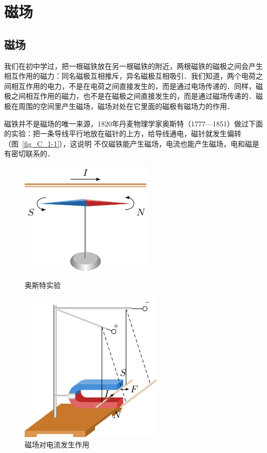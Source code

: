 \chapter{磁场}\label{chapter-magnetic-field}

\section{磁场}
我们在初中学过，把一根磁铁放在另一根磁铁的附近，两根磁铁的磁极之间会产生相互作用的磁力：同名磁极互相推斥，异名磁极互相吸引．我们知道，两个电荷之间相互作用的电力，不是在电荷之间直接发生的，而是通过电场传递的．同样，磁极之间相互作用的磁力，也不是在磁极之间直接发生的，而是通过磁场传递的．磁极在周围的空间里产生磁场，磁场对处在它里面的磁极有磁场力的作用．

磁铁并不是磁场的唯一来源，1820年丹麦物理学家奥斯特（1777—1851）做过下面的实验：把一条导线平行地放在磁针的上方，给导线通电，磁针就发生偏转（图~\ref{fig_C_1-1}），这说明
不仅磁铁能产生磁场，电流也能产生磁场，电和磁是有密切联系的．
\begin{figure}[htbp]
    \centering
    \begin{minipage}[t]{0.48\textwidth}
        \centering
        \includegraphics{fig/C/1-1.pdf}
        \caption{奥斯特实验}\label{fig_C_1-1}
    \end{minipage}
    \begin{minipage}[t]{0.48\textwidth}
        \centering
        \includegraphics{fig/C/1-2.pdf}
        \caption{磁场对电流发生作用}\label{fig_C_1-2}
    \end{minipage}
\end{figure}

